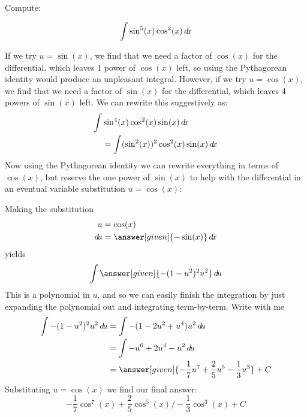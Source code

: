 \documentclass{ximera}
\begin{document}
\begin{example}
  Compute:

  \[
  \int \sin^{5}(x) \cos^2(x) \mathop{}\!d\! x
  \]

  \begin{explanation}
   
    If we try $u=\sin(x)$, we find that we need a factor of $\cos(x)$ for the differential, which leaves 1 power of $\cos(x)$ left, so using the Pythagorean identity would produce an unpleasant integral.  However, if we try $u=\cos(x)$, we find that we need a factor of $\sin(x)$ for the differential, which leaves 4 powers of $\sin(x)$ left.    We can rewrite this suggestively as:
    \begin{align*}
    \int &\sin^4(x) \cos^2(x) \sin(x) \mathop{}\!d\! x \\
    &= \int (\sin^2(x))^2 \cos^2(x) \sin(x) \mathop{}\!d\! x
    \end{align*}
    Now using the Pythagorean identity we can rewrite everything in
    terms of $\cos(x)$, but reserve the one power of $\sin(x)$ to help
    with the differential in an eventual variable substitution $u=\cos(x)$:
    \begin{center}%
    \end{center}
    Making the substitution
    \begin{align*}
      u &= \cos(x)\\
      \d u &=\answer[given]{-\sin(x)} \d x
    \end{align*}
    yields
    \[
    \int \answer[given]{-(1-u^2)^2 u^2} \d u
    \]
    This is a polynomial in $u$, and so we can easily finish the
    integration by just expanding the polynomial out and integrating
    term-by-term. Write with me
    \begin{align*}
      \int {-(1-u^2)^2 u^2} \d u &= \int -(1-2u^2+u^4)u^2\d u\\
      &= \int-u^6 + 2u^4-u^2 \d u\\
      &=\answer[given]{-\frac{1}{7}u^7 + \frac{2}{5}u^5 -\frac{1}{3} u^3}+C
    \end{align*}
    Substituting $u = \cos(x)$ we find our final answer:
    \[
    -\frac{1}{7}\cos^7(x) + \frac{2}{5}\cos^5(x)/ - \frac{1}{3} \cos^3(x)+C
    \]
  \end{explanation}
\end{example}
\end{document}
